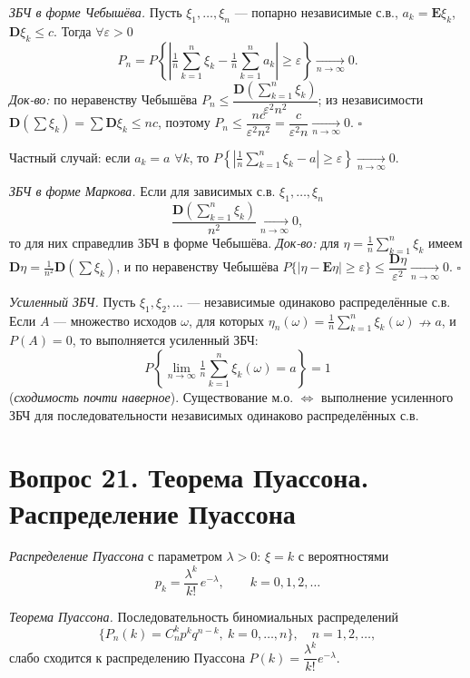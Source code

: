 \textit{ЗБЧ в форме Чебышёва.} Пусть $\xi_1,\dots,\xi_n$ — попарно независимые с.в., $a_k=\mathbf{E}\xi_k$, $\mathbf{D}\xi_k\le c$. Тогда $\forall\varepsilon>0$
\[ P_n=P\!\left\{\left|\tfrac1n\sum_{k=1}^n\xi_k-\tfrac1n\sum_{k=1}^n a_k\right|\ge\varepsilon\right\}\xrightarrow[n\to\infty]{}0. \]
\textit{Док-во:} по неравенству Чебышёва $P_n\le\dfrac{\mathbf{D}\!\left(\sum_{k=1}^n\xi_k\right)}{\varepsilon^2 n^2}$; из независимости $\mathbf{D}\!\left(\sum\xi_k\right)=\sum\mathbf{D}\xi_k\le nc$, поэтому $P_n\le\dfrac{nc}{\varepsilon^2n^2}=\dfrac{c}{\varepsilon^2n}\xrightarrow[n\to\infty]{}0$. \hfill$\square$

Частный случай: если $a_k=a$ $\forall k$, то $P\!\left\{\left|\tfrac1n\sum_{k=1}^n\xi_k-a\right|\ge\varepsilon\right\}\xrightarrow[n\to\infty]{}0$.

\textit{ЗБЧ в форме Маркова.} Если для зависимых с.в. $\xi_1,\dots,\xi_n$
\[ \frac{\mathbf{D}\!\left(\sum_{k=1}^n\xi_k\right)}{n^2}\xrightarrow[n\to\infty]{}0, \]
то для них справедлив ЗБЧ в форме Чебышёва.
\textit{Док-во:} для $\eta=\tfrac1n\sum_{k=1}^n\xi_k$ имеем $\mathbf{D}\eta=\tfrac1{n^2}\mathbf{D}\!\left(\sum\xi_k\right)$, и по неравенству Чебышёва $P\{|\eta-\mathbf{E}\eta|\ge\varepsilon\}\le\dfrac{\mathbf{D}\eta}{\varepsilon^2}\xrightarrow[n\to\infty]{}0$. \hfill$\square$

\textit{Усиленный ЗБЧ.} Пусть $\xi_1,\xi_2,\dots$ — независимые одинаково распределённые с.в. Если $A$ — множество исходов $\omega$, для которых $\eta_n(\omega)=\tfrac1n\sum_{k=1}^n\xi_k(\omega)\nrightarrow a$, и $P(A)=0$, то выполняется усиленный ЗБЧ:
\[ P\!\left\{\lim_{n\to\infty}\tfrac1n\sum_{k=1}^n\xi_k(\omega)=a\right\}=1 \]
(\textit{сходимость почти наверное}). Существование м.о. $\Leftrightarrow$ выполнение усиленного ЗБЧ для последовательности независимых одинаково распределённых с.в.

\section*{Вопрос 21. Теорема Пуассона. Распределение Пуассона}

\textit{Распределение Пуассона} с параметром $\lambda>0$: $\xi=k$ с вероятностями
\[ p_k=\frac{\lambda^k}{k!}\,e^{-\lambda},\qquad k=0,1,2,\dots \]

\textit{Теорема Пуассона.} Последовательность биномиальных распределений
\[ \{P_n(k)=C_n^k p^k q^{n-k},\ k=0,\dots,n\},\quad n=1,2,\dots, \]
слабо сходится к распределению Пуассона $P(k)=\dfrac{\lambda^k}{k!}e^{-\lambda}$.


